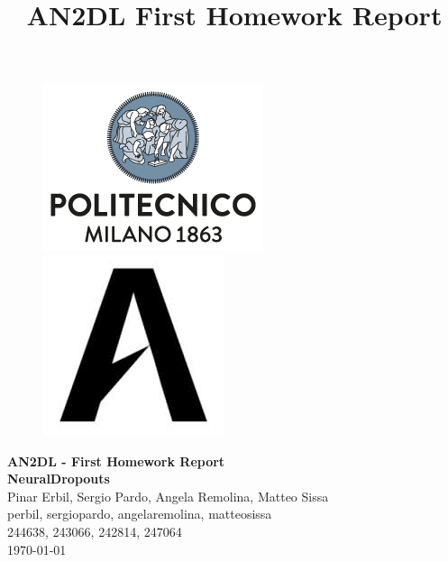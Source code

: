 \documentclass[11pt]{article}
\title{AN2DL First Homework Report}
\begin{document}
    
    \begin{figure}[H]
        \raggedright
        \includegraphics[scale=0.4]{polimi.png} \hfill \includegraphics[scale=0.3]{airlab.jpeg}
    \end{figure}
    
    \vspace{5mm}
    
    \begin{center}
        {\Large \textbf{AN2DL - First Homework Report}}\\
        \vspace{2mm}
        {\Large \textbf{NeuralDropouts}}\\
        \vspace{2mm}
        {\large Pinar Erbil,}
        {\large Sergio Pardo,}
        {\large Angela Remolina,}
        {\large Matteo Sissa}\\
        \vspace{2mm}
        {perbil,}
        {sergiopardo,}
        {angelaremolina,}
        {matteosissa}\\
        \vspace{2mm}
        {244638,}
        {243066,}
        {242814,}
        {247064}\\
        \vspace{5mm}
        \today
    \end{center}    
    \vspace{5mm}
    
\end{document}
